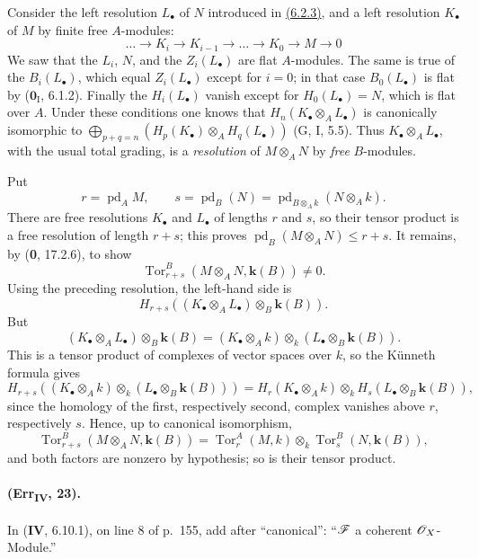 Consider the left resolution $L_\bullet$ of $N$ introduced in {\hyperref[IV.6.2.3]{(6.2.3)}},
and a left resolution $K_\bullet$ of $M$ by finite free $A$-modules:
\[
 \ldots\longrightarrow K_i\longrightarrow K_{i-1}\longrightarrow
 \ldots\longrightarrow K_0\longrightarrow M\longrightarrow0
\]
We saw that the $L_i$, $N$, and the $Z_i(L_\bullet)$ are flat
$A$-modules.  The same is true of the $B_i(L_\bullet)$, which equal
$Z_i(L_\bullet)$ except for $i=0$; in that case $B_0(L_\bullet)$ is flat
by ($\mathbf{0}_{\mathrm I}$, 6.1.2).  Finally the $H_i(L_\bullet)$ vanish except
for $H_0(L_\bullet)=N$, which is flat over $A$.  Under these conditions
one knows that
$H_n(K_\bullet\otimes_AL_\bullet)$ is canonically isomorphic to
$\bigoplus_{p+q=n}(H_p(K_\bullet)\otimes_AH_q(L_\bullet))$ (G, I, 5.5).  Thus $K_\bullet\otimes_AL_\bullet$, with the usual total
grading, is a \emph{resolution} of $M\otimes_AN$ by \emph{free} $B$-modules.

Put
\[
 r=\operatorname{pd}_AM,\qquad
 s=\operatorname{pd}_B(N)=
   \operatorname{pd}_{B\otimes_Ak}(N\otimes_Ak).
\]
There are free resolutions $K_\bullet$ and $L_\bullet$ of lengths $r$
and $s$, so their tensor product is a free resolution of length $r+s$;
this proves
$\operatorname{pd}_B(M\otimes_AN)\leq r+s$.  It remains, by
(\textbf{0}, 17.2.6), to show
\[
 \operatorname{Tor}^{B}_{r+s}(M\otimes_AN,\boldsymbol{k}(B))\neq0.
\]
Using the preceding resolution, the left-hand side is
\[
 H_{r+s}((K_\bullet\otimes_AL_\bullet)\otimes_B\boldsymbol{k}(B)).
\]
But
\[
 (K_\bullet\otimes_AL_\bullet)\otimes_B\boldsymbol{k}(B)
 = (K_\bullet\otimes_Ak)\otimes_k
   (L_\bullet\otimes_B\boldsymbol{k}(B)).
\]
This is a tensor product of complexes of vector spaces over $k$, so the
K\"unneth formula gives
\[
 H_{r+s}((K_\bullet\otimes_Ak)\otimes_k(L_\bullet\otimes_B\boldsymbol{k}(B)))=H_r(K_\bullet\otimes_Ak)\otimes_k
 H_s(L_\bullet\otimes_B\boldsymbol{k}(B)),
\]
since the homology of the first, respectively second, complex vanishes
above $r$, respectively $s$.  Hence, up to canonical isomorphism,
\[
 \operatorname{Tor}^{B}_{r+s}(M\otimes_AN,\boldsymbol{k}(B))=
 \operatorname{Tor}^{A}_{r}(M,k)\otimes_k
 \operatorname{Tor}^{B}_{s}(N,\boldsymbol{k}(B)),
\]
and both factors are nonzero by hypothesis; so is their tensor product.

\paragraph{(Err\textsubscript{\textmd{IV}}, 23).}
In (\textbf{IV}, 6.10.1), on line 8 of p.~155, add after ``canonical'':
``$\mathscr{F}$ a coherent $\mathscr{O}_X$-Module.''

